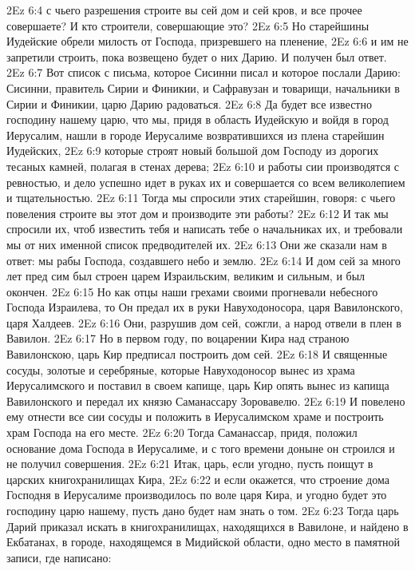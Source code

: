 \vs 2Ez 6:4 с чьего разрешения строите вы сей дом и сей кров, и все прочее совершаете? И кто строители, совершающие это?
\vs 2Ez 6:5 Но старейшины Иудейские обрели милость от Господа, призревшего на пленение,
\vs 2Ez 6:6 и им не запретили строить, пока возвещено будет о них Дарию. И получен был ответ.
\rsbpar\vs 2Ez 6:7 Вот список с письма, которое Сисинни писал и которое послали Дарию: Сисинни, правитель Сирии и Финикии, и Сафравузан и товарищи, начальники в Сирии и Финикии, царю Дарию радоваться.
\vs 2Ez 6:8 Да будет все известно господину нашему царю, что мы, придя в область Иудейскую и войдя в город Иерусалим, нашли в городе Иерусалиме возвратившихся из плена старейшин Иудейских,
\vs 2Ez 6:9 которые строят новый большой дом Господу из дорогих тесаных камней, полагая в стенах дерева;
\vs 2Ez 6:10 и работы сии производятся с ревностью, и дело успешно идет в руках их и совершается со всем великолепием и тщательностью.
\vs 2Ez 6:11 Тогда мы спросили этих старейшин, говоря: с чьего повеления строите вы этот дом и производите эти работы?
\vs 2Ez 6:12 И так мы спросили их, чтоб известить тебя и написать тебе о начальниках их, и требовали мы от них именной список предводителей их.
\vs 2Ez 6:13 Они же сказали нам в ответ: мы рабы Господа, создавшего небо и землю.
\vs 2Ez 6:14 И дом сей за много лет пред сим был строен царем Израильским, великим и сильным, и был окончен.
\vs 2Ez 6:15 Но как отцы наши грехами своими прогневали небесного Господа Израилева, то Он предал их в руки Навуходоносора, царя Вавилонского, царя Халдеев.
\vs 2Ez 6:16 Они, разрушив дом сей, сожгли, а народ отвели в плен в Вавилон.
\vs 2Ez 6:17 Но в первом году, по воцарении Кира над страною Вавилонскою, царь Кир предписал построить дом сей.
\vs 2Ez 6:18 И священные сосуды, золотые и серебряные, которые Навуходоносор вынес из храма Иерусалимского и поставил в своем капище, царь Кир опять вынес из капища Вавилонского и передал их князю Саманассару Зоровавелю.
\vs 2Ez 6:19 И повелено ему отнести все сии сосуды и положить в Иерусалимском храме и построить храм Господа на его месте.
\vs 2Ez 6:20 Тогда Саманассар, придя, положил основание дома Господа в Иерусалиме, и с того времени доныне он строился и не получил совершения.
\vs 2Ez 6:21 Итак, царь, если угодно, пусть поищут в царских книгохранилищах Кира,
\vs 2Ez 6:22 и если окажется, что строение дома Господня в Иерусалиме производилось по воле царя Кира, и угодно будет это господину царю нашему, пусть дано будет нам знать о том.
\rsbpar\vs 2Ez 6:23 Тогда царь Дарий приказал искать в книгохранилищах, находящихся в Вавилоне, и найдено в Екбатанах, в городе, находящемся в Мидийской области, одно место в памятной записи, где написано:
